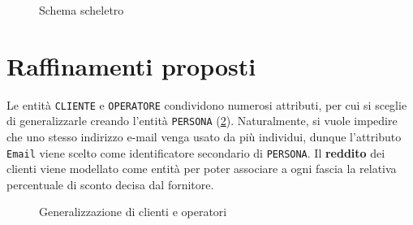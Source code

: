 \documentclass[a4paper,12pt]{report}
\begin{document}
\begin{figure}[H]
\centering{}
\caption{Schema scheletro}
\label{fig:barebones}
\end{figure}

\section{Raffinamenti proposti}
Le entità \texttt{CLIENTE} e \texttt{OPERATORE} condividono numerosi attributi, per cui si sceglie di generalizzarle creando l'entità \texttt{PERSONA} (\cref{fig:persons}). Naturalmente, si vuole impedire che uno stesso indirizzo e-mail venga usato da più individui, dunque l'attributo \texttt{Email} viene scelto come identificatore secondario di \texttt{PERSONA}.
\newline
Il \textbf{reddito} dei clienti viene modellato come entità per poter associare a ogni fascia la relativa percentuale di sconto decisa dal fornitore.

\begin{figure}[H]
\centering{}
\caption{Generalizzazione di clienti e operatori}
\label{fig:persons}
\end{figure}
\end{document}
